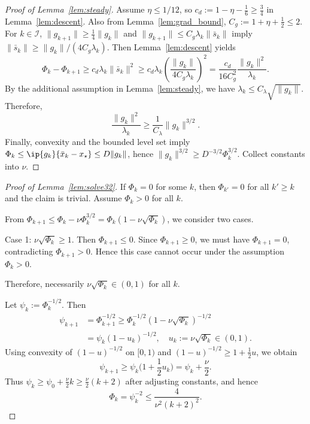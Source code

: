 \documentclass[review,onefignum,onetabnum]{siamart171218}
\begin{document}
\begin{proof}[Proof of Lemma~\ref{lem:steady}]
Assume $\eta\le 1/12$, so $c_d:=1-\eta-\frac16\ge \frac34$ in Lemma~\ref{lem:descent}.
Also from Lemma~\ref{lem:grad_bound}, $C_g:=1+\eta+\frac12\le 2$.
For $k\in\mathcal I$, $\|g_{k+1}\|\ge \frac14\|g_k\|$ and $\|g_{k+1}\|\le C_g\lambda_k\|\bar s_k\|$ imply
$\|\bar s_k\|\ge \|g_k\|/(4C_g\lambda_k)$.
Then Lemma~\ref{lem:descent} yields
\[
\Phi_k-\Phi_{k+1}\ge c_d\lambda_k\|\bar s_k\|^2
\ge c_d\lambda_k\left(\frac{\|g_k\|}{4C_g\lambda_k}\right)^2
=\frac{c_d}{16C_g^2}\frac{\|g_k\|^2}{\lambda_k}.
\]
By the additional assumption in Lemma~\ref{lem:steady}, we have $\lambda_k\le C_\lambda\sqrt{\|g_k\|}$.
Therefore,
\[
\frac{\|g_k\|^2}{\lambda_k}\ge \frac{1}{C_\lambda}\|g_k\|^{3/2}.
\]
Finally, convexity and the bounded level set imply $\Phi_k\le \ip{g_k}{\bar x_k-x_\star}\le D\|g_k\|$, hence
$\|g_k\|^{3/2}\ge D^{-3/2}\Phi_k^{3/2}$.
Collect constants into $\nu$.
\end{proof}

\begin{proof}[Proof of Lemma~\ref{lem:solve32}]
If $\Phi_k=0$ for some $k$, then $\Phi_{k'}=0$ for all $k'\ge k$ and the claim is trivial.
Assume $\Phi_k>0$ for all $k$.

From $\Phi_{k+1}\le \Phi_k-\nu \Phi_k^{3/2}=\Phi_k(1-\nu\sqrt{\Phi_k})$, we consider two cases.

Case 1: $\nu\sqrt{\Phi_k}\ge 1$.
Then $\Phi_{k+1}\le 0$. Since $\Phi_{k+1}\ge 0$, we must have $\Phi_{k+1}=0$,
contradicting $\Phi_{k+1}>0$.
Hence this case cannot occur under the assumption $\Phi_k>0$.

Therefore, necessarily $\nu\sqrt{\Phi_k}\in(0,1)$ for all $k$.

Let $\psi_k:=\Phi_k^{-1/2}$. Then
\begin{align*}
\psi_{k+1}&=\Phi_{k+1}^{-1/2}\ge \Phi_k^{-1/2}(1\!-\!\nu\sqrt{\Phi_k})^{-1/2}\\
&=\psi_k(1\!-\!u_k)^{-1/2},\quad u_k:=\nu\sqrt{\Phi_k}\in(0,1).
\end{align*}
Using convexity of $(1-u)^{-1/2}$ on $[0,1)$ and $(1-u)^{-1/2}\ge 1+\frac12u$, we obtain
\[
\psi_{k+1}\ge \psi_k\Big(1+\frac12 u_k\Big)=\psi_k+\frac{\nu}{2}.
\]
Thus $\psi_k\ge \psi_0+\frac{\nu}{2}k\ge \frac{\nu}{2}(k+2)$ after adjusting constants, and hence
\[
\Phi_k=\psi_k^{-2}\le \frac{4}{\nu^2(k+2)^2}.
\]
\end{proof}
\end{document}
